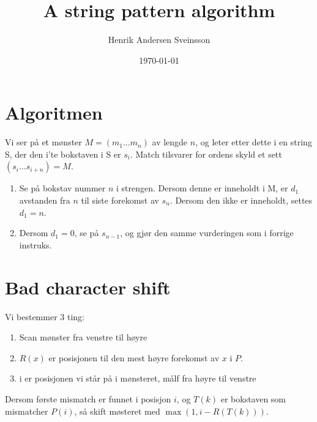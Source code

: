 \documentclass[a4paper]{article}
\title{A string pattern algorithm}
\author{Henrik Andersen Sveinsson}
\date{\today}
\begin{document}
\maketitle

\section{Algoritmen}

Vi ser på et mønster $M = (m_1 ... m_n)$ av lengde $n$, og leter etter dette i en string S, der den i'te bokstaven i S er $s_i$. Match tilsvarer for ordens skyld et sett $(s_i ... s_{i+n})= M$.
\begin{enumerate}
\item Se på bokstav nummer $n$ i strengen. Dersom denne er inneholdt i M, er $d_1$ avstanden fra $n$ til siste forekomst av $s_n$. Dersom den ikke er inneholdt, settes $d_1 = n$.
\item Dersom $d_1 = 0$, se på $s_{n-1}$, og gjør den samme vurderingen som i forrige instruks.
\end{enumerate}


\section{Bad character shift}
Vi bestemmer 3 ting:
\begin{enumerate}
\item Scan mønster fra venstre til høyre
\item $R(x)$ er posisjonen til den mest høyre forekomst av $x$ i $P$.
\item i er posisjonen vi står på i mønsteret, målf fra høyre til venstre
\end{enumerate}
Dersom første mismatch er funnet i posisjon $i$, og $T(k)$ er bokstaven som mismatcher $P(i)$, så skift møsteret med $\max(1, i-R(T(k)))$. 
\end{document}
